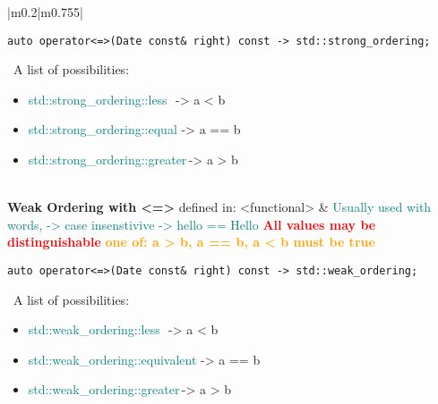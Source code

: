 \documentclass[main.tex,fontsize=8pt,paper=a4,paper=portrait,DIV=calc]{scrartcl}
\begin{document}
\begin{table}[ht!]
\begin{tabular}{|m{0.2\linewidth}|m{0.755\linewidth}|}
\begin{lstlisting}
auto operator<=>(Date const& right) const -> std::strong_ordering;
\end{lstlisting}
\, \newline
A list of possibilities:\newline
\begin{itemize}
  \item \textcolor{teal}{std::strong\_ordering::less} \,\,-> a < b 
  \item \textcolor{teal}{std::strong\_ordering::equal}\,\,-> a == b 
  \item \textcolor{teal}{std::strong\_ordering::greater}\,-> a > b 
  \vspace{-3mm}
\end{itemize}\\
\hline
\textbf{Weak Ordering with <=>}\newline
defined in: <functional> & 
\textcolor{teal}{Usually used with words, -> case insenstivive -> hello == Hello}\newline
\textcolor{red}{\textbf{All values may be distinguishable}}\newline
\textcolor{orange}{\textbf{one of: a > b, a == b, a < b must be true}}\newline
\begin{lstlisting}
auto operator<=>(Date const& right) const -> std::weak_ordering;
\end{lstlisting}
\, \newline
A list of possibilities:\newline
\begin{itemize}
  \item \textcolor{teal}{std::weak\_ordering::less} \,\,-> a < b 
  \item \textcolor{teal}{std::weak\_ordering::equivalent}\,\,-> a == b 
  \item \textcolor{teal}{std::weak\_ordering::greater}\,-> a > b 
  \vspace{-3mm}
\end{itemize}\\
\hline
\end{tabular}
\end{table}
\pagebreak
\end{document}
